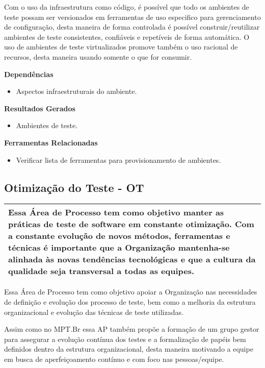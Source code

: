 Com o uso da infraestrutura como código, é possível que todo os ambientes de teste possam ser versionados em ferramentas de uso especifico para gerenciamento de configuração, desta maneira de forma controlada é possível construir/reutilizar ambientes de teste consistentes, confiáveis e repetíveis de forma automática. O uso de ambientes de teste virtualizados promove também o uso racional de recursos, desta maneira usando somente o que for consumir.

\textbf{Dependências}
\begin{itemize}
    \item Aspectos infraestruturais do ambiente.
\end{itemize}

\textbf{Resultados Gerados}
\begin{itemize}
    \item Ambientes de teste.

\end{itemize}

\textbf{Ferramentas Relacionadas}
\begin{itemize}
    \item Verificar lista de ferramentas para provisionamento de ambientes.
\end{itemize}

\subsection{Otimização do  Teste - OT}
\label{sec:ot}

\begin{table}[H]
\centering
\begin{tabular}{|p{130mm}|}
\hline
Essa Área de Processo tem como objetivo manter as práticas de teste de software em constante otimização. Com a constante evolução de novos métodos, ferramentas e técnicas é importante que a Organização mantenha-se alinhada às novas tendências tecnológicas e que a cultura da qualidade seja transversal a todas as equipes. \\
\hline
\end{tabular}
\end{table}

Essa Área de Processo tem como objetivo apoiar a Organização nas necessidades de definição e evolução dos processo de teste, bem como a melhoria da estrutura organizacional e evolução das técnicas de teste utilizadas.

Assim como no MPT.Br \cite{GuiaMPTbr} essa AP também propõe a formação de um grupo gestor para assegurar a evolução contínua dos testes e a formalização de papéis bem definidos dentro da estrutura organizacional, desta maneira motivando a equipe em busca de aperfeiçoamento contínuo e com foco nas pessoas/equipe.


